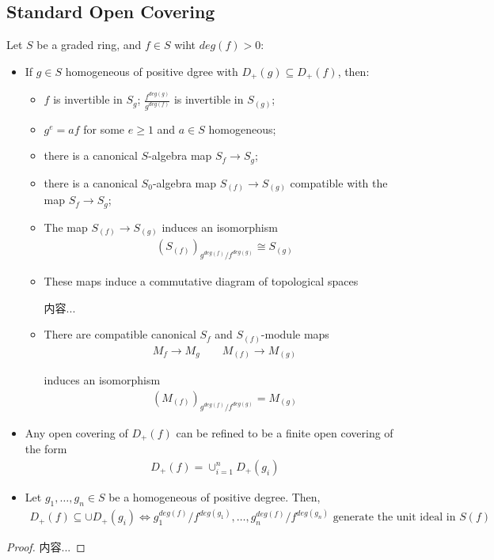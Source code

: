 \documentclass[Total.tex]{subfiles}
\begin{document}
			\subsection{Standard Open Covering}
					\begin{lemma}
						Let $S$ be a graded ring, and $f\in S$ wiht $deg(f)>0$:
						\begin{itemize}
							\item If $g\in S$ homogeneous of positive dgree with $D_+(g)\subseteq D_+(f)$, then:
								\begin{itemize}
									\item $f$ is invertible in $S_g$; $\frac{f^{deg(g)}}{g^{deg(f)}}$ is invertible in $S_{(g)}$;
									\item $g^e=af$ for some $e\geq 1$ and $a\in S$ homogeneous;
									\item there is a canonical $S$-algebra map $S_f\rightarrow S_g$;
									\item there is a canonical $S_0$-algebra map $S_{(f)}\rightarrow S_{(g)}$ compatible with the map $S_f\rightarrow S_g$;
									\item The map $S_{(f)}\rightarrow S_{(g)}$ induces an isomorphism
									\begin{gather*}
										(S_{(f)})_{g^{deg(f)}/f^{deg(g)}}\cong S_{(g)}
									\end{gather*}
									\item These maps induce a commutative diagram of topological spaces
									\begin{center}
										内容...
									\end{center}
									\item There are compatible canonical $S_f$ and $S_{(f)}$-module maps
									\begin{gather*}
										M_f\rightarrow M_g\qquad M_{(f)}\rightarrow M_{(g)}
									\end{gather*}
									
									induces an isomorphism
									\begin{gather*}
										(M_{(f)})_{g^{deg(f)}/f^{deg(g)}}=M_{(g)}
									\end{gather*}
								\end{itemize}
							\item Any open covering of $D_+(f)$ can be refined to be a finite open covering of the form
							\begin{gather*}
								D_+(f)=\cup_{i=1}^n D_+(g_i)
							\end{gather*}
							\item Let $g_1,\dots,g_n\in S$ be a homogeneous of positive degree. Then,
							\begin{gather*}
								D_+(f)\subseteq \cup D_+(g_i)\Leftrightarrow g_1^{deg(f)}/f^{deg(g_1)},\dots,g_n^{deg(f)}/f^{deg(g_n)}\mbox{ generate the unit ideal in $S(f)$}
							\end{gather*}
						\end{itemize}
					\end{lemma}
					\begin{proof}
						内容...
					\end{proof}
					
\end{document}
